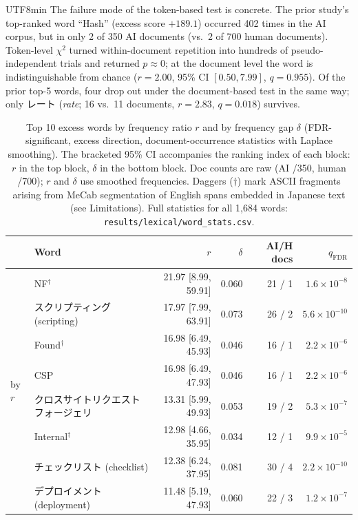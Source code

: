\documentclass[11pt,a4paper]{article}
\begin{document}
\begin{CJK}{UTF8}{min}
The failure mode of the token-based test is concrete. The prior study's top-ranked word ``Hash'' (excess score $+189.1$) occurred 402 times in the AI corpus, but in only 2 of 350 AI documents (vs.\ 2 of 700 human documents). Token-level $\chi^2$ turned within-document repetition into hundreds of pseudo-independent trials and returned $p \approx 0$; at the document level the word is indistinguishable from chance ($r=2.00$, 95\% CI $[0.50, 7.99]$, $q=0.955$). Of the prior top-5 words, four drop out under the document-based test in the same way; only レート (\textit{rate}; 16 vs.\ 11 documents, $r=2.83$, $q=0.018$) survives.

\begin{table}[H]
\centering
\caption{Top 10 excess words by frequency ratio $r$ and by frequency gap $\delta$ (FDR-significant, excess direction, document-occurrence statistics with Laplace smoothing). The bracketed 95\% CI accompanies the ranking index of each block: $r$ in the top block, $\delta$ in the bottom block. Doc counts are raw (AI /350, human /700); $r$ and $\delta$ use smoothed frequencies. Daggers ($\dagger$) mark ASCII fragments arising from MeCab segmentation of English spans embedded in Japanese text (see Limitations). Full statistics for all 1{,}684 words: \texttt{results/lexical/word\_stats.csv}.}
\label{tab:topwords}
\footnotesize
\setlength{\tabcolsep}{3.5pt}
\begin{tabular}{llrrrr}
\toprule
 & Word & $r$ & $\delta$ & AI/H docs & $q_{\text{FDR}}$ \\
\midrule
\multirow{10}{*}{by $r$}
 & NF$^\dagger$ & 21.97 [8.99, 59.91] & 0.060 & 21 / 1 & $1.6\times10^{-8}$ \\
 & スクリプティング (scripting) & 17.97 [7.99, 63.91] & 0.073 & 26 / 2 & $5.6\times10^{-10}$ \\
 & Found$^\dagger$ & 16.98 [6.49, 45.93] & 0.046 & 16 / 1 & $2.2\times10^{-6}$ \\
 & CSP & 16.98 [6.49, 47.93] & 0.046 & 16 / 1 & $2.2\times10^{-6}$ \\
 & クロスサイトリクエストフォージェリ & 13.31 [5.99, 49.93] & 0.053 & 19 / 2 & $5.3\times10^{-7}$ \\
 & Internal$^\dagger$ & 12.98 [4.66, 35.95] & 0.034 & 12 / 1 & $9.9\times10^{-5}$ \\
 & チェックリスト (checklist) & 12.38 [6.24, 37.95] & 0.081 & 30 / 4 & $2.2\times10^{-10}$ \\
 & デプロイメント (deployment) & 11.48 [5.19, 47.93] & 0.060 & 22 / 3 & $1.2\times10^{-7}$ \\

\end{tabular}
\end{table}
\end{CJK}
\end{document}

